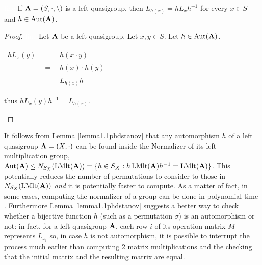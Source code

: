 \documentclass{mcom-l}
\begin{document}
\begin{lemma}\label{lemma1.1phdstanov}\textcolor{white}{line}\newline
If $\mathbf{A}=(S,\cdot, \backslash)$ is a left quasigroup, then $L_{h(x)} = hL_xh^{-1}$ for every $x \in S$ and $h\in \operatorname{Aut}(\mathbf{A})$. 
\begin{proof}\textcolor{white}{line}\newline
Let $\mathbf{A}$ be a left quasigroup. Let $x,y\in S$. Let $h \in \operatorname{Aut}(\mathbf{A})$. 
\begin{center}
    \begin{tabular}{ccl}
        $hL_x(y)$ & $=$ & $h(x \cdot y)$\\
                          & $=$ & $h(x) \cdot h(y)$\\
                          & $=$ & $L_{h(x)}h$\\
\end{tabular}
 thus $hL_x(y)h^{-1}= L_{h(x)}$.
\end{center}
\end{proof}
\end{lemma}
\noindent It follows from Lemma \ref{lemma1.1phdstanov} that any automorphism $h$ of a left quasigroup $\mathbf{A} = (X, \cdot)$ can be found inside the Normalizer of its left multiplication group,  $\operatorname{Aut}(\mathbf{A}) \leq N_{S_X}(\operatorname{LMlt}(\mathbf{A})) = \{ h \in S_X : h\operatorname{LMlt}(\mathbf{A})h^{-1} = \operatorname{LMlt}(\mathbf{A})\}$. \newline This potentially reduces the number of permutations to consider to those in \newline $N_{S_X}(\operatorname{LMlt}(\mathbf{A}))$ \emph{and} it is potentially faster to compute. As a matter of fact, in some cases, computing the normalizer of a group can be done in polynomial time \cite{holt2005handbook}.\newline
Furthermore Lemma \ref{lemma1.1phdstanov} suggests a better way to check whether a bijective function $h$ (such as a permutation $\sigma$) is an automorphism or not: in fact, for a left quasigroup $\mathbf{A}$, each row $i$ of its operation matrix $M$ represents $L_{x_i}$ so, in case $h$ is not automorphism, it is possible to interrupt the process much earlier than computing 2 matrix multiplications and the checking that the initial matrix and the resulting matrix are equal.
\end{document}
